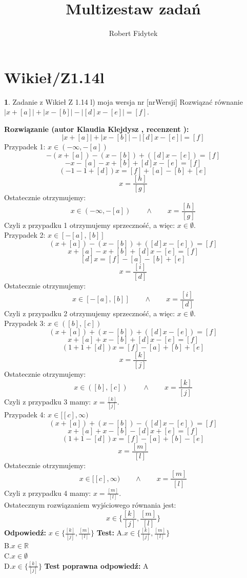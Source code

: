 \documentclass[12pt, a4paper]{article}
\title{Multizestaw zadań}
\author{Robert Fidytek}
\date{}
\theoremstyle{definition} %
\newtheorem{zad}{}
\newcommand{\kategoria}[1]{\section{#1}} %
\newcommand{\zadStart}[1]{\begin{zad}#1\newline} %
\newcommand{\zadStop}{\end{zad}}   %
\newcommand{\rozwStart}[2]{\noindent \textbf{Rozwiązanie (autor #1 , recenzent #2): }\newline} %
\newcommand{\rozwStop}{\newline}                                            %
\newcommand{\odpStart}{\noindent \textbf{Odpowiedź:}\newline}    %
\newcommand{\odpStop}{\newline}                                             %
\newcommand{\testStart}{\noindent \textbf{Test:}\newline} %
\newcommand{\testStop}{\newline} %
\newcommand{\kluczStart}{\noindent \textbf{Test poprawna odpowiedź:}\newline} %
\newcommand{\kluczStop}{\newline} %
\begin{document}
\maketitle


\kategoria{Wikieł/Z1.14l}
\zadStart{Zadanie z Wikieł Z 1.14 l) moja wersja nr [nrWersji]}
Rozwiązać równanie $|x+[a]|+|x-[b]|-|[d]x-[e]|=[f]$.
\zadStop
\rozwStart{Klaudia Klejdysz}{}
$$|x+[a]|+|x-[b]|-|[d]x-[e]|=[f]$$
\indent Przypadek 1: $x\in(-\infty,-[a])$
$$-(x+[a])-(x-[b])+([d]x-[e])=[f]$$
$$-x-[a]-x+[b]+[d]x-[e]=[f]$$
$$(-1-1+[d])x=[f]+[a]-[b]+[e]$$
$$x=\frac{[h]}{[g]}$$
Ostatecznie otrzymujemy:
$$x\in(-\infty,-[a])\qquad\land\qquad x=\frac{[h]}{[g]}$$
Czyli z przypadku 1 otrzymujemy sprzeczność, a więc: $x\in\emptyset$.\\


Przypadek 2: $x\in[-[a],[b]]$ $$(x+[a])-(x-[b])+([d]x-[e])=[f]$$
$$x+[a]-x+[b]+[d]x-[e]=[f]$$
$$[d]x=[f]-[a]-[b]+[e]$$
$$x=\frac{[i]}{[d]}$$
Ostatecznie otrzymujemy:
$$x\in[-[a],[b]]\qquad\land\qquad x=\frac{[i]}{[d]}$$
Czyli z przypadku 2 otrzymujemy sprzeczność, a więc: $x\in\emptyset$.\\


Przypadek 3: $x\in([b],[c])$ $$(x+[a])+(x-[b])+([d]x-[e])=[f]$$
$$x+[a]+x-[b]+[d]x-[e]=[f]$$
$$(1+1+[d])x=[f]-[a]+[b]+[e]$$
$$x=\frac{[k]}{[j]}$$
Ostatecznie otrzymujemy:
$$x\in([b],[c])\qquad\land\qquad x=\frac{[k]}{[j]}$$
Czyli z przypadku 3 mamy: $x=\frac{[k]}{[j]}$.\\


Przypadek 4: $x\in[[c],\infty)$ $$(x+[a])+(x-[b])-([d]x-[e])=[f]$$
$$x+[a]+x-[b]-[d]x+[e]=[f]$$
$$(1+1-[d])x=[f]-[a]+[b]-[e]$$
$$x=\frac{[m]}{[l]}$$
Ostatecznie otrzymujemy:
$$x\in[[c],\infty)\qquad\land\qquad x=\frac{[m]}{[l]}$$
Czyli z przypadku 4 mamy: $x=\frac{[m]}{[l]}$.\\
Ostatecznym rozwiązaniem wyjściowego równania jest:
$$x\in\bigg\{\frac{[k]}{[j]},\frac{[m]}{[l]}\bigg\}$$
\rozwStop
\odpStart
$x\in\bigg\{\frac{[k]}{[j]},\frac{[m]}{[l]}\bigg\}$
\odpStop
\testStart
A.$x\in\bigg\{\frac{[k]}{[j]},\frac{[m]}{[l]}\bigg\}$\\
B.$x\in\mathbb{R}$\\
C.$x\in\emptyset$\\
D.$x\in\bigg\{\frac{[k]}{[j]}\bigg\}$
\testStop
\kluczStart
A
\kluczStop
\end{document}
